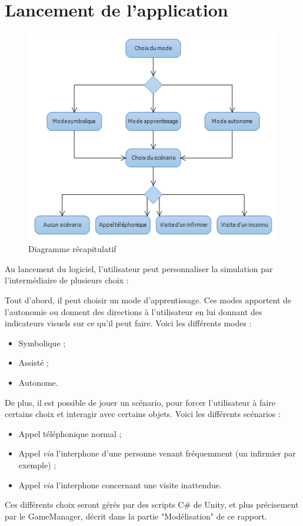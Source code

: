 \section{Lancement de l'application}

\begin{figure}[h]
\centering
\includegraphics[width=1\textwidth]{4-conception/img/diagActivite.png}
\caption{ Diagramme récapitulatif }
\end{figure}

Au lancement du logiciel, l'utilisateur peut personnaliser la simulation par l'intermédiaire de plusieurs choix :

Tout d'abord, il peut choisir un mode d'apprentissage. Ces modes apportent de l'autonomie ou donnent des directions à l'utilisateur en lui donnant des indicateurs visuels sur ce qu'il peut faire. Voici les différents modes :
\begin{itemize}
\item Symbolique ;
\item Assisté ;
\item Autonome.
\end{itemize}


De plus, il est possible de jouer un scénario, pour forcer l'utilisateur à faire certains choix et interagir avec certains objets. Voici les différents scénarios :
\begin{itemize}
\item Appel téléphonique normal ;
\item Appel \textit{via} l'interphone d'une personne venant fréquemment (un infirmier par exemple) ;
\item Appel \textit{via} l'interphone concernant une visite inattendue.
\end{itemize}


Ces différents choix seront gérés par des scripts C\# de Unity, et plus précisement par le GameManager, décrit dans la partie "Modélisation" de ce rapport.


